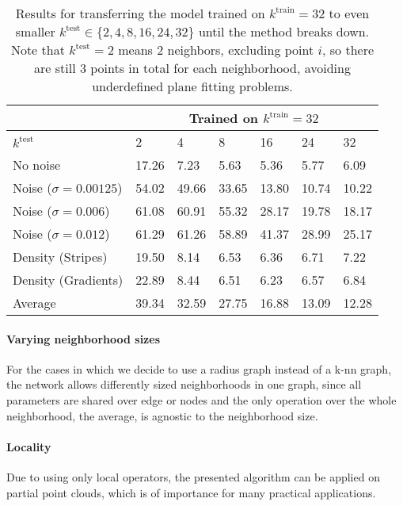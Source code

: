 \documentclass[10pt,twocolumn,letterpaper]{article}
\begin{document}
\begin{table}[t]
\small
\setlength\tabcolsep{3.5pt}
\centering
\begin{tabular}{lllllll}
\toprule
& \multicolumn{6}{c}{Trained on $k^{\textrm{train}} = 32$} \\
\midrule
$k^{\textrm{test}}$ & 2  &  4  & 8 & 16 & 24 & 32  \\ 
\midrule
No noise  & 17.26 &  7.23 & 5.63 & 5.36 & 5.77 & 6.09  \\ 
Noise ($\sigma = 0.00125$)  & 54.02 & 49.66  & 33.65 & 13.80 & 10.74 & 10.22 \\ 
Noise ($\sigma = 0.006$)   & 61.08 & 60.91 & 55.32 & 28.17 & 19.78 & 18.17  \\ 
Noise ($\sigma = 0.012$) & 61.29 & 61.26 & 58.89 & 41.37 & 28.99 &  25.17  \\ 
Density (Stripes)   &  19.50 & 8.14 &6.53 & 6.36 & 6.71 & 7.22 \\
Density (Gradients)   & 22.89 & 8.44 & 6.51 & 6.23 & 6.57 & 6.84 \\ 
\midrule
Average    & 39.34 & 32.59 & 27.75 & 16.88 & 13.09 & 12.28 \\ 
\bottomrule
\end{tabular}
\caption{Results for transferring  the model trained on $k^{\textrm{train}} = 32$ to even smaller $k^{\textrm{test}} \in \{2, 4, 8, 16, 24, 32\}$ until the method breaks down. Note that $k^{\textrm{test}} = 2$ means $2$ neighbors, excluding point $i$, so there are still $3$ points in total for each neighborhood, avoiding underdefined plane fitting problems.}
\label{tab:transfer_smallk}
\end{table}


\paragraph{Varying neighborhood sizes} For the cases in which we decide to use a radius graph instead of a k-nn graph, the network allows differently sized neighborhoods in one graph, since all parameters are shared over edge or nodes and the only operation over the whole neighborhood, the average, is agnostic to the neighborhood size.

\paragraph{Locality}

Due to using only local operators, the presented algorithm can be applied on partial point clouds, which is of importance for many practical applications.
\end{document}
